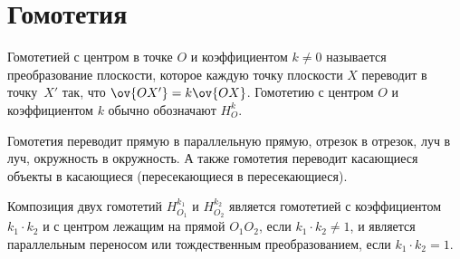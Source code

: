 
\section*{Гомотетия}

Гомотетией с центром в точке $O$ и коэффициентом $k \neq 0$ называется
преобразование плоскости, которое каждую точку плоскости $X$ переводит
в точку~$X'$ так, что $\ov{OX'} = k \ov{OX}$.
Гомотетию с центром $O$ и коэффициентом $k$ обычно обозначают $H_O^k$. 

Гомотетия переводит прямую в параллельную прямую, отрезок в отрезок, луч в луч,
окружность в окружность.
А также гомотетия переводит касающиеся объекты в касающиеся (пересекающиеся
в пересекающиеся). 

Композиция двух гомотетий $H_{O_1}^{k_1}$ и $H_{O_2}^{k_2}$ является гомотетией
с коэффициентом $k_1 \cdot k_2$ и с центром лежащим на прямой $O_1 O_2$, если
$k_1 \cdot k_2 \neq 1$, и является параллельным переносом или тождественным
преобразованием, если $k_1 \cdot k_2 = 1$.

